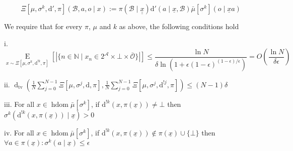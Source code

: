 \documentclass[a4paper]{article}
\newcommand{\E}[1]{\underset{#1}{\operatorname{E}}}
\newcommand{\D}{\mathrm{d}}
\newcommand{\Dtv}{\operatorname{d}_{\text{tv}}}
\newcommand{\Nats}{\mathbb{N}}
\newcommand{\Abs}[1]{\left\vert #1 \right\vert}
\newcommand{\Ob}{\mathcal{O}}
\newcommand{\A}{\mathcal{A}}
\DeclareMathOperator{\HD}{hdom}
\newcommand{\B}{\mathcal{B}}
\begin{document}
$$\Xi\left[\mu,\sigma^k,\D',\pi\right]\left(\B,a,o \mid x\right):=\pi\left(\B \mid \underline{\underline{x}}\right)\D'\left(a \mid \underline{x},\B\right) \bar{\mu}[\sigma^k]\left(o \mid \underline{x}a\right)$$

We require that for every $\pi$, $\mu$ and $k$ as above, the following conditions hold

i. $$\E{x \sim\Xi\left[\mu,\sigma^k,\D^{!k},\pi\right]}\left[\Abs{\{n \in \Nats \mid x_n \in 2^\A \times \bot \times \bar{\Ob}\}}\right] \leq \frac{\ln N}{\delta \ln\left(1 + \epsilon(1-\epsilon)^{(1-\epsilon)/\epsilon}\right)}=O\left(\frac{\ln N}{\delta \epsilon}\right)$$

ii. $\Dtv\left(\frac{1}{N}\sum_{j=0}^{N-1}{\Xi\left[\mu,\sigma^j,\D,\pi\right]},\frac{1}{N}\sum_{j=0}^{N-1}{\Xi\left[\mu,\sigma^j,\D^{!j},\pi\right]}\right) \leq (N-1)\delta$

iii. For all $x \in \HD{\bar{\mu}[\sigma^k]}$, if $\D^{!k}\left(x,\pi\left(\underline{x}\right)\right) \ne \bot$ then $\sigma^k\left(\D^{!k}\left(x,\pi\left(\underline{x}\right)\right) \mid \underline{x}\right) > 0$

iv. For all $x \in \HD{\bar{\mu}[\sigma^k]}$, if $\D^{!k}\left(x,\pi\left(\underline{x}\right)\right) \not\in \pi\left(\underline{x}\right) \cup \{\bot\}$ then $\forall a \in \pi\left(\underline{x}\right): \sigma^k\left(a \mid \underline{x}\right) \leq \epsilon$
\end{document}
